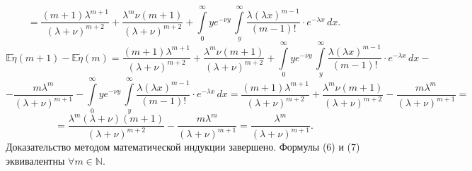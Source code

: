 \documentclass[12pt]{article}
\begin{document}
\begin{itemize}
$$=  \dfrac{(m+1)\lambda^{m+1}}{(\lambda+\nu)^{m+2}}+\dfrac{\lambda^{m}\nu(m+1)}{(\lambda+\nu)^{m+2}} + \int\limits^\infty_0 ye^{-\nu y}\,\int\limits^\infty_y \dfrac{\lambda(\lambda x)^{m-1}}{(m-1)!}\cdot e^{-\lambda x}\, dx.$$
 $$\mathbb{E}\tilde{\eta}(m+1) - \mathbb{E}\tilde{\eta}(m) =  \dfrac{(m+1)\lambda^{m+1}}{(\lambda+\nu)^{m+2}}+\dfrac{\lambda^{m}\nu(m+1)}{(\lambda+\nu)^{m+2}} + \int\limits^\infty_0 ye^{-\nu y}\,\int\limits^\infty_y \dfrac{\lambda(\lambda x)^{m-1}}{(m-1)!}\cdot e^{-\lambda x}\, dx -$$
$$- \dfrac{m\lambda^m}{(\lambda+\nu)^{m+1}}-\int\limits^\infty_0 ye^{-\nu y}\,\int\limits^\infty_y \dfrac{\lambda(\lambda x)^{m-1}}{(m-1)!}\cdot e^{-\lambda x}\, dx = \dfrac{(m+1)\lambda^{m+1}}{(\lambda+\nu)^{m+2}}+\dfrac{\lambda^{m}\nu(m+1)}{(\lambda+\nu)^{m+2}} - \dfrac{m\lambda^m}{(\lambda+\nu)^{m+1}}= $$
$$=\dfrac{\lambda^{m}(\lambda+\nu)(m+1)}{(\lambda+\nu)^{m+2}} - \dfrac{m\lambda^m}{(\lambda+\nu)^{m+1}}= \dfrac{\lambda^m}{(\lambda+\nu)^{m+1}}.$$
Доказательство методом математической индукции завершено. Формулы (6) и (7) эквивалентны $\forall m \in \mathbb{N}$.\\
\end{itemize}
\end{document}
